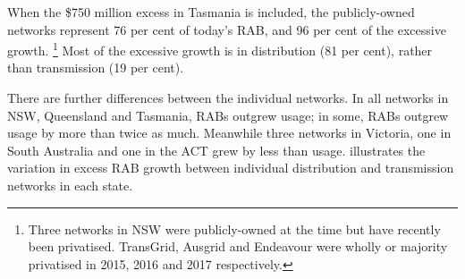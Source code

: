 \documentclass[FrontPage]{grattan}
\begin{document}
{
}

When the \$750 million excess in Tasmania is included, the publicly-owned networks represent 76 per cent of today's RAB, and 96 per cent of the excessive growth.%
\footnote{Three networks in NSW were publicly-owned at the time but have recently been privatised. TransGrid, Ausgrid and Endeavour were wholly or majority privatised in 2015, 2016 and 2017 respectively.}
Most of the excessive growth is in distribution (81 per cent), rather than transmission (19 per cent).

There are further differences between the individual networks. In all networks in NSW, Queensland and Tasmania, RABs outgrew usage; in some, RABs outgrew usage by more than twice as much. Meanwhile three networks in Victoria, one in South Australia and one in the ACT grew by less than usage.  illustrates the variation in excess RAB growth between individual distribution and transmission networks in each state. 


\end{document}

